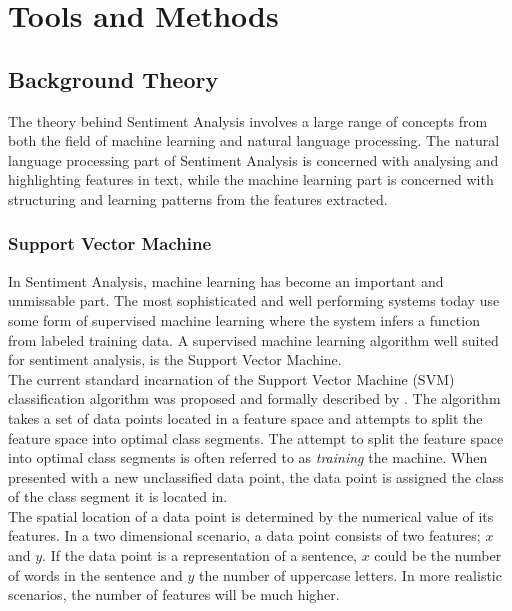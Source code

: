 \chapter{Tools and Methods}
\label{cha:background_theory}

\section{Background Theory}
The theory behind Sentiment Analysis involves a large range of concepts from both the field of machine learning and natural language processing. The natural language processing part of Sentiment Analysis is concerned with analysing and highlighting features in text, while the machine learning part is concerned with structuring and learning patterns from the features extracted.

\subsection{Support Vector Machine}
In Sentiment Analysis, machine learning has become an important and unmissable part. The most sophisticated and well performing systems today use some form of supervised machine learning where the system infers a function from labeled training data. A supervised machine learning algorithm well suited for sentiment analysis, is the Support Vector Machine. \\

The current standard incarnation of the Support Vector Machine (SVM) classification algorithm was proposed and formally described by \cite{VapnikCortes1995}. The algorithm takes a set of data points located in a feature space and attempts to split the feature space into optimal class segments. The attempt to split the feature space into optimal class segments is often referred to as \textit{training} the machine. When presented with a new unclassified data point, the data point is assigned the class of the class segment it is located in. \\

The spatial location of a data point is determined by the numerical value of its features. In a two dimensional scenario, a data point consists of two features; $x$ and $y$. If the data point is a representation of a sentence, $x$ could be the number of words in the sentence and $y$ the number of uppercase letters. In more realistic scenarios, the number of features will be much higher.  \\

